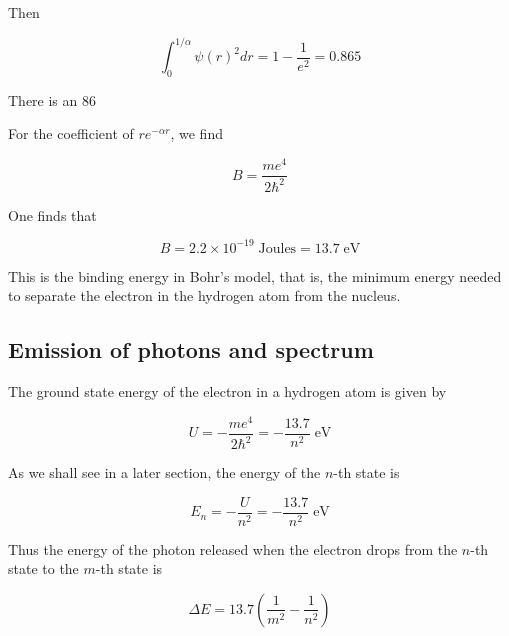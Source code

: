 Then

\begin{equation}
\int_0^{1/\alpha} \psi(r)^2 dr = 1 - \frac{1}{e^2} = 0.865
\end{equation}

There is an 86%

For the coefficient of $re^{-\alpha r}$, we find

\begin{equation}
B = \frac{ me^4 }{ 2\hbar^2 }
\end{equation}

One finds that

\begin{equation}
B = 2.2\times 10^{-19}\;\text{Joules} = 13.7\;\text{eV}
\end{equation}

This is the binding energy in Bohr's model, that is, the minimum energy needed to separate the electron in the hydrogen atom from the nucleus.

\subsection{Emission of photons and spectrum}


The ground state energy of the electron in a hydrogen atom is given by

\begin{equation}
U = -\frac{me^4 }{ 2\hbar^2 } = -\frac{13.7}{n^2}\;\text{eV}
\end{equation}

As we shall see in a later section, the energy of the $n$-th state is

\begin{equation}
E_n = -\frac{U}{n^2} = -\frac{13.7}{n^2}\;\text{eV}
\end{equation}

Thus the energy of the photon released when the electron drops from the $n$-th state to the $m$-th state is

\begin{equation}
\Delta E = 13.7\left(\frac{1}{m^2} - \frac{1}{n^2}\right)
\end{equation}

